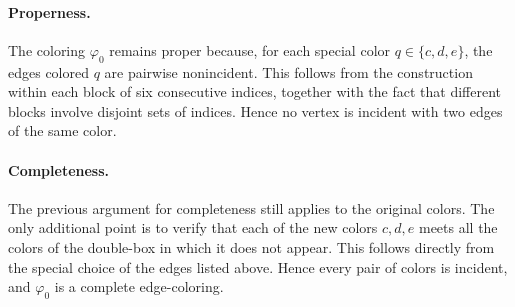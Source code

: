 \documentclass{article}
\newcommand{\blue}[1]{\textcolor{blue}{#1}}
\newcommand{\red}[1]{\textcolor{red}{#1}}
\def\greeen{\textcolor[RGB]{47, 141, 26 }}
\begin{document}
\paragraph{Properness.}
The coloring $\varphi_0$ remains proper because, for each special color 
$q \in \{c,d,e\}$, the edges colored $q$ are pairwise nonincident. 
This follows from the construction within each block of six consecutive 
indices, together with the fact that different blocks involve disjoint 
sets of indices. Hence no vertex is incident with two edges of the 
same color.


\paragraph{Completeness.}

The previous argument for completeness still applies to the original
colors.
The only additional point is to verify that each of the new colors
$c,d,e$
meets all the colors of the double-box in which it does not appear.
This follows directly from the special choice of the edges listed above.
Hence every pair of colors is incident, and
$\varphi_0$
is a complete edge-coloring.


\end{document}
